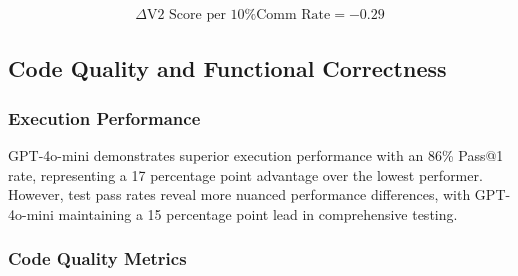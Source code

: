 \documentclass[conference]{IEEEtran}
\begin{document}
\begin{align}
\Delta \text{V2 Score per 10\% Comm Rate} = -0.29
\end{align}

\subsection{Code Quality and Functional Correctness}

\subsubsection{Execution Performance}

\begin{table}[ht]
\centering
\small
\caption{Functional Correctness and Test Performance}
\label{tab:functional_correctness}
\end{table}

GPT-4o-mini demonstrates superior execution performance with an 86\% Pass@1 rate, representing a 17 percentage point advantage over the lowest performer. However, test pass rates reveal more nuanced performance differences, with GPT-4o-mini maintaining a 15 percentage point lead in comprehensive testing.

\subsubsection{Code Quality Metrics}

\begin{table}[ht]
\centering
\small
\caption{Code Quality and Trustworthiness Metrics}
\label{tab:code_quality}
\end{table}
\end{document}
